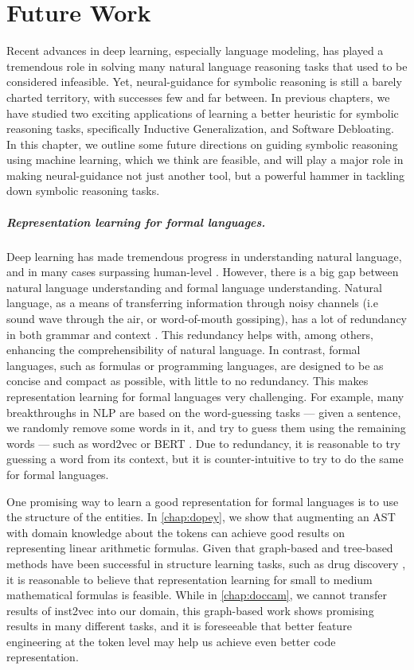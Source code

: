 \chapter{Future Work}
\label{chap:future}
Recent advances in deep learning, especially language modeling, has played a tremendous role in solving many natural language reasoning tasks that used to be considered infeasible. Yet, neural-guidance for symbolic reasoning is still a barely charted territory, with successes few and far between.
In previous chapters, we have studied two exciting applications of learning a better heuristic for symbolic reasoning tasks, specifically Inductive Generalization, and Software Debloating.
In this chapter, we outline some future directions on guiding symbolic reasoning using machine learning, which we think are feasible, and will play a major role in making neural-guidance not just another tool, but a powerful hammer in tackling down symbolic reasoning tasks.

\paragraph{Representation learning for formal languages.} Deep learning has made
tremendous progress in understanding natural language, and in many cases
surpassing human-level \cite{glue-bench}.
However, there is a big gap between natural language understanding and formal
language understanding. Natural language, as a means of transferring information
through noisy channels (i.e sound wave through the air, or word-of-mouth
gossiping), has a lot of redundancy in both grammar and context
\cite{ling_redundancy}.
This redundancy helps with, among others, enhancing the comprehensibility of
natural language.
In contrast, formal languages, such as formulas or programming languages, are
designed to be as concise and compact as possible, with little to no redundancy.
This makes representation learning for formal languages very challenging.
For example, many breakthroughs in NLP are based on the word-guessing tasks --- given a sentence, we randomly remove some words in it, and try to guess them using the remaining words --- such as word2vec \cite{word2vec} or BERT \cite{bert}. Due to redundancy, it is reasonable to try guessing a word from its context, but it is counter-intuitive to try to do the same for formal languages. 

One promising way to learn a good representation for formal languages is to use the structure of the entities. In \cref{chap:dopey}, we show that augmenting an AST with domain knowledge about the tokens can achieve good results on representing linear arithmetic formulas. Given that graph-based and tree-based methods have been successful in structure learning tasks, such as drug discovery \cite{drug_dis}, it is reasonable to believe that representation learning for small to medium mathematical formulas is feasible. While in \cref{chap:doccam}, we cannot transfer results of inst2vec \cite{inst2vec} into our domain, this graph-based work shows promising results in many different tasks, and it is foreseeable that better feature engineering at the token level may help us achieve even better code representation.

